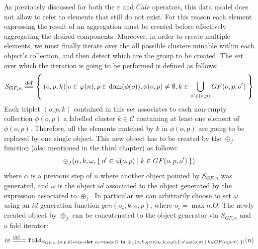 As previously discussed for both the $\varepsilon$ and $Calc$ operators, this data model does not allow to refer to elements that still do not exist. For this reason each element expressing the result of an aggregation must be created before effectively aggregating the desired components. Moreover, in order to create multiple elements, we must finally iterate over the all possible clusters minable within each object's collection, and then detect which are the group to be created. The set over which the iteration is going to be performed is defined as follows:
\[S_{GF,n}\overset{\mathrm{def}}{=\mathrel{\mkern-3mu}=}\Set{(o,p,k)\Big|o\in \varphi(n),p\in\operatorname{dom}(\phi(o)),\phi(o,p)\neq\emptyset, k\in\bigcup_{o'\phi(o,p)} GF(o,p,o')}\]
Each triplet $(o,p,k)$ contained in this set associates to each non-empty collection $\phi(o,p)$ a labelled cluster $k\in\mathcal{C}$ containing at least one element of $\phi(o,p)$. Therefore, all the elements matched by   $k$ in $\phi(o,p)$ are going to be replaced by one single object. This new object has to be created by the $\oplus_f$ function (also mentioned in the third chapter) as follows: 
\[\oplus_f(\alpha,k,\omega,\Set{o'\in\phi(o,p)|k\in GF(o,p,o')})\]
where $\alpha$ is a previous step of $n$ where another object pointed by $S_{GF,n}$ was generated, and $\omega$ is the object $id$ associated to the object generated by the expression associated to $\oplus_f$. In particular we can arbitrarily choose to set $\omega$ using an $id$ generation function $gen(o_{\tilde{c}},k,o,p)$, where  $o_{\tilde{c}} = \max n.O$. The newly created object by $\oplus_f$  can be concatenated to the object generator via $S_{GF,n}$ and a fold iterator:
\begin{equation}\label{eq:ce}
ce\overset{\mathrm{def}}{=\mathrel{\mkern-3mu}=}=\texttt{fold}_{S_{GF,n},(o,p,k)\mapsto \alpha\mapsto\textbf{let }o_{\tilde{c}}=\max O\textbf{ in } \oplus_f(\alpha,k,gen(o_{\tilde{c}},k,o,p),\Set{o'\in\phi(o,p)|k\in GF(o,p,o')})}(n)
\end{equation}
